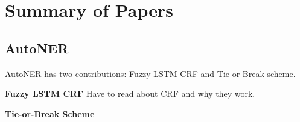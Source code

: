 \section{Summary of Papers}
\label{sec:summary}

\subsection{AutoNER}
AutoNER \cite{autoner} has two contributions: Fuzzy LSTM CRF and Tie-or-Break scheme.


\noindent\textbf{Fuzzy LSTM CRF}
Have to read about CRF and why they work.


\noindent\textbf{Tie-or-Break Scheme}

